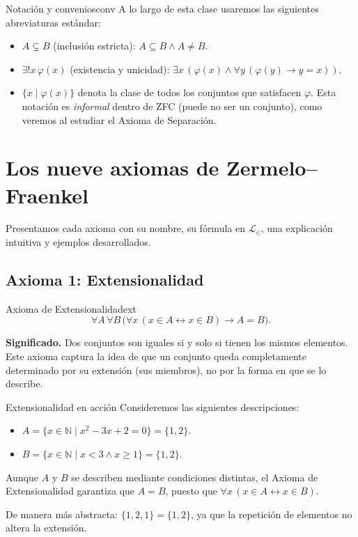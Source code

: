 \begin{observacion}{Notación y convenios}{conv}
A lo largo de esta clase usaremos las siguientes abreviaturas estándar:
\begin{itemize}[leftmargin=2em]
  \item $A \subsetneq B$ (inclusión estricta): $A \subseteq B \wedge A \neq B$.
  \item $\exists! x\,\varphi(x)$ (existencia y unicidad): $\exists x\,(\varphi(x) \wedge \forall y\,(\varphi(y) \to y = x))$.
  \item $\{x \mid \varphi(x)\}$ denota la clase de todos los conjuntos que satisfacen $\varphi$. Esta notación es \emph{informal} dentro de ZFC (puede no ser un conjunto), como veremos al estudiar el Axioma de Separación.
\end{itemize}
\end{observacion}

\section{Los nueve axiomas de Zermelo–Fraenkel}

Presentamos cada axioma con su nombre, su fórmula en $\mathcal{L}_{\in}$, una explicación intuitiva y ejemplos desarrollados.

\subsection{Axioma 1: Extensionalidad}

\begin{definicion}{Axioma de Extensionalidad}{ext}
\[
  \forall A\,\forall B\,\bigl(\forall x\,(x \in A \leftrightarrow x \in B) \to A = B\bigr).
\]
\end{definicion}

\textbf{Significado.} Dos conjuntos son iguales si y solo si tienen los mismos elementos. Este axioma captura la idea de que un conjunto queda completamente determinado por su extensión (sus miembros), no por la forma en que se lo describe.

\begin{ejemplo}{Extensionalidad en acción}{}
Consideremos las siguientes descripciones:
\begin{itemize}[leftmargin=2em]
  \item $A = \{x \in \mathbb{N} \mid x^2 - 3x + 2 = 0\} = \{1, 2\}$.
  \item $B = \{x \in \mathbb{N} \mid x < 3 \wedge x \geq 1\} = \{1, 2\}$.
\end{itemize}
Aunque $A$ y $B$ se describen mediante condiciones distintas, el Axioma de Extensionalidad garantiza que $A = B$, puesto que $\forall x\,(x \in A \leftrightarrow x \in B)$.

De manera más abstracta: $\{1, 2, 1\} = \{1, 2\}$, ya que la repetición de elementos no altera la extensión.
\end{ejemplo}

